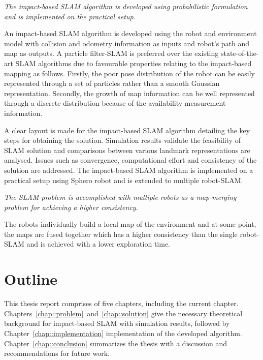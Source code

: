 \begin{center}
{\it \centering The impact-based SLAM algorithm is developed using probabilistic formulation and is implemented on the practical setup.}
\end{center}

An impact-based SLAM algorithm is developed using the robot and environment model with collision and odometry information as inputs and robot's path and map as outputs. A particle filter-SLAM is preferred over the existing state-of-the-art SLAM algorithms due to favourable properties relating to the impact-based mapping as follows. Firstly, the poor pose distribution of the robot can be easily represented through a set of particles rather than a smooth Gaussian representation. Secondly, the growth of map information can be well represented through a discrete distribution because of the availability measurement information.
 
A clear layout is made for the impact-based SLAM algorithm detailing the key steps for obtaining the solution. Simulation results validate the feasibility of SLAM solution and comparisons between various landmark representations are analysed. Issues such as convergence, computational effort and consistency of the solution are addressed. The impact-based SLAM algorithm is implemented on a practical setup using Sphero robot and is extended to multiple robot-SLAM. 

\begin{center}
{\it The SLAM problem is accomplished with multiple robots as a map-merging problem for achieving a higher consistency.}
\end{center}

The robots individually build a local map of the environment and at some point, the maps are fused together which has a higher consistency than the single robot-SLAM and is achieved with a lower exploration time.

\section{Outline} \label{sec::outline}
This thesis report comprises of five chapters, including the current chapter. Chapters~\ref{chap::problem}~and~\ref{chap::solution} give the necessary theoretical background for impact-based SLAM with simulation results, followed by Chapter~\ref{chap::implementation} implementation of the developed algorithm. Chapter~\ref{chap::conclusion} summarizes the thesis with a discussion and recommendations for future work. 

